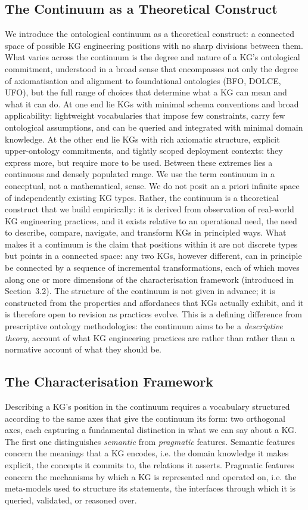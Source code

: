 \documentclass[runningheads]{llncs}
\newcommand{\add}[1]{\textcolor{addedcolor}{#1}}
\begin{document}
\subsection{The Continuum as a Theoretical Construct}
\add{
We introduce the ontological continuum as a theoretical construct: a connected space of possible KG engineering positions with no sharp divisions between them. What varies across the continuum is the degree and nature of a KG's ontological commitment, understood in a broad sense that encompasses not only the degree of axiomatisation and alignment to foundational ontologies (BFO, DOLCE, UFO), but the full range of choices that determine what a KG can mean and what it can do. At one end lie KGs with minimal schema conventions and broad applicability: lightweight vocabularies that impose few constraints, carry few ontological assumptions, and can be queried and integrated with minimal domain knowledge. At the other end lie KGs with rich axiomatic structure, explicit upper-ontology commitments, and tightly scoped deployment contexts: they express more, but require more to be used. Between these extremes lies a continuous and densely populated range.
We use the term continuum in a conceptual, not a mathematical, sense. We do not posit an a priori infinite space of independently existing KG types. Rather, the continuum is a theoretical construct that we build empirically: it is derived from observation of real-world KG engineering practices, and it exists relative to an operational need, the need to describe, compare, navigate, and transform KGs in principled ways. What makes it a continuum is the claim that positions within it are not discrete types but points in a connected space: any two KGs, however different, can in principle be connected by a sequence of incremental transformations, each of which moves along one or more dimensions of the characterisation framework (introduced in Section~3.2). The structure of the continuum is not given in advance; it is constructed from the properties and affordances that KGs actually exhibit, and it is therefore open to revision as practices evolve. This is a defining difference from prescriptive ontology methodologies: the continuum aims to be a \emph{descriptive theory}, account of what KG engineering practices are rather than rather than a normative account of what they should be.}

\subsection{The Characterisation Framework}
\add{Describing a KG's position in the continuum requires a vocabulary structured according to the same axes that give the continuum its form: two orthogonal axes, each capturing a fundamental distinction in what we can say about a KG.
The first one distinguishes \emph{semantic} from \emph{pragmatic} features. Semantic features concern the meanings that a KG encodes, i.e. the domain knowledge it makes explicit, the concepts it commits to, the relations it asserts. Pragmatic features concern the mechanisms by which a KG is represented and operated on, i.e. the meta-models used to structure its statements, the interfaces through which it is queried, validated, or reasoned over.}
\end{document}
